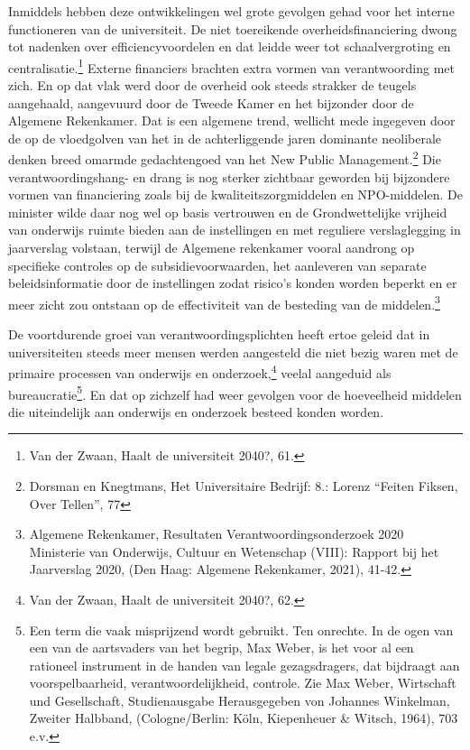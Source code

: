\documentclass{jote-book}
\begin{document}
	Inmiddels hebben deze ontwikkelingen wel grote gevolgen gehad voor het interne functioneren van de universiteit. De niet toereikende overheidsfinanciering dwong tot nadenken over efficiencyvoordelen en dat leidde weer tot schaalvergroting en centralisatie.\footnote{Van der Zwaan, Haalt de universiteit 2040?, 61. } Externe financiers brachten extra vormen van verantwoording met zich. En op dat vlak werd door de overheid ook steeds strakker de teugels aangehaald, aangevuurd door de Tweede Kamer en het bijzonder door de Algemene Rekenkamer. Dat is een algemene trend, wellicht mede ingegeven door de op de vloedgolven van het in de achterliggende jaren dominante neoliberale denken breed omarmde gedachtengoed van het New Public Management.\footnote{Dorsman en Knegtmans, Het Universitaire Bedrijf: 8.: Lorenz “Feiten Fiksen, Over Tellen”, 77} Die verantwoordingshang- en drang is nog sterker zichtbaar geworden bij bijzondere vormen van financiering zoals bij de kwaliteitszorgmiddelen en NPO-middelen. De minister wilde daar nog wel op basis vertrouwen en de Grondwettelijke vrijheid van onderwijs ruimte bieden aan de instellingen en met reguliere verslaglegging in jaarverslag volstaan, terwijl de Algemene rekenkamer vooral aandrong op specifieke controles op de subsidievoorwaarden, het aanleveren van separate beleidsinformatie door de instellingen zodat risico's konden worden beperkt en er meer zicht zou ontstaan op de effectiviteit van de besteding van de middelen.\footnote{Algemene Rekenkamer, Resultaten Verantwoordingsonderzoek 2020 Ministerie van Onderwijs, Cultuur en Wetenschap (VIII): Rapport bij het Jaarverslag 2020, (Den Haag: Algemene Rekenkamer, 2021), 41-42.}



	De voortdurende groei van verantwoordingsplichten heeft ertoe geleid dat in universiteiten steeds meer mensen werden aangesteld die niet bezig waren met de primaire processen van onderwijs en onderzoek,\footnote{Van der Zwaan, Haalt de universiteit 2040?, 62.} veelal aangeduid als bureaucratie\footnote{Een term die vaak misprijzend wordt gebruikt. Ten onrechte. In de ogen van een van de aartsvaders van het begrip, Max Weber, is het voor al een rationeel instrument in de handen van legale gezagsdragers, dat bijdraagt aan voorspelbaarheid, verantwoordelijkheid, controle. Zie Max Weber, Wirtschaft und Gesellschaft, Studienausgabe Herausgegeben von Johannes Winkelman, Zweiter Halbband, (Cologne/Berlin: Köln, Kiepenheuer \& Witsch, 1964), 703 e.v.}. En dat op zichzelf had weer gevolgen voor de hoeveelheid middelen die uiteindelijk aan onderwijs en onderzoek besteed konden worden.
\end{document}
